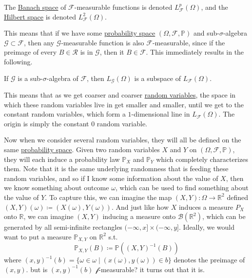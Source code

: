   \begin{definition}
    \label{def:the-space-lpfomega}
    The \hyperref[mv-def:banach-space]{Banach space} of $\mathcal{F}$-measurable functions is denoted $L_\mathcal{F}^p (\Omega)$, and the \hyperref[fa-def:hilbert-space]{Hilbert space} is denoted $L_\mathcal{F}^2 (\Omega)$. 
  \end{definition}

  This means that if we have some \hyperref[def:probability-space]{probability space} $(\Omega, \mathcal{F}, \mathbb{P})$ and  sub-$\sigma$-algebra $\mathcal{G} \subset \mathcal{F}$, then any $\mathcal{G}$-measurable function is also $\mathcal{F}$-measurable, since if the preimage of every $B \in \mathcal{R}$ is in $\mathcal{G}$, then it $B \in \mathcal{F}$. This immediately results in the following. 

  \begin{theorem}
    \label{thm:sub-sigma-algebras-give-subspaces}
    If $\mathcal{G}$ is a sub-$\sigma$-algebra of $\mathcal{F}$, then $L_\mathcal{G} (\Omega)$ is a subspace of $L_\mathcal{F} (\Omega)$. 
  \end{theorem}

  This means that as we get coarser and coarser \hyperref[def:random-variable]{random variables}, the space in which these random variables live in get smaller and smaller, until we get to the constant random variables, which form a $1$-dimensional line in $L_\mathcal{F} (\Omega)$. The origin is simply the constant $0$ random variable. 

  Now when we consider several random variables, they will all be defined on the same \hyperref[def:probability-space]{probability space}. Given two random variables $X$ and $Y$ on $(\Omega, \mathcal{F}, \mathbb{P})$, they will each induce a probability law $\mathbb{P}_X$ and $\mathbb{P}_Y$ which completely characterizes them. Note that it is the same underlying randomness that is feeding these random variables, and so if I know some information about the value of $X$, then we know something about outcome $\omega$, which can be used to find something about the value of $Y$. To capture this, we can imagine the map $(X, Y) : \Omega \to \mathbb{R}^2$ defined $(X, Y)(\omega) \coloneqq (X(\omega), Y(\omega))$. And just like how $X$ induces a measure $P_X$ onto $\mathbb{R}$, we can imagine $(X, Y)$ inducing a measure onto $\mathcal{B}(\mathbb{R}^2)$, which can be generated by all semi-infinite rectangles $(-\infty, x] \times (-\infty, y]$. Ideally, we would want to put a measure $\mathbb{P}_{X, Y}$ on $\mathbb{R}^2$ s.t. 
  \begin{equation}
    \mathbb{P}_{X, Y}(B) \coloneqq \mathbb{P}((X, Y)^{-1}(B))
  \end{equation}
  where $(x, y)^{-1}(b) = \{ \omega \in \omega \mid (x(\omega), y(\omega)) \in b\}$ denotes the preimage of $(x, y)$. but is $(x, y)^{-1}(b)$ $\mathcal{f}$-measurable? it turns out that it is. 

